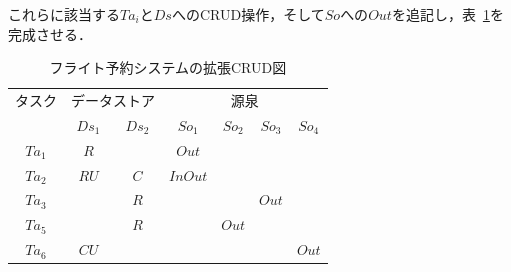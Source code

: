 これらに該当する$Ta_i$と$Ds$へのCRUD操作，そして$So$への$Out$を追記し，表~\ref{ECRUD2}を完成させる．

\begin{table}[t]
\caption{フライト予約システムの拡張CRUD図}
\label{ECRUD2}
\begin{center}
\begin{tabular}{c||c|c||c|c|c|c}
\hline
タスク&\multicolumn{2}{c||}{データストア}&\multicolumn{4}{c}{源泉}\\
&$Ds_1$&$Ds_2$&$So_1$&$So_2$&$So_3$&$So_4$\\
\hline\hline
$Ta_1$&$R$&&$Out$&&&\\
\hline
$Ta_2$&$RU$&$C$&$InOut$&&&\\
\hline
$Ta_3$&&$R$&&&$Out$&\\
\hline
$Ta_5$&&$R$&&$Out$&&\\
\hline
$Ta_6$&$CU$&&&&&$Out$\\
\hline
\end{tabular}
\end{center}　
\end{table}%

